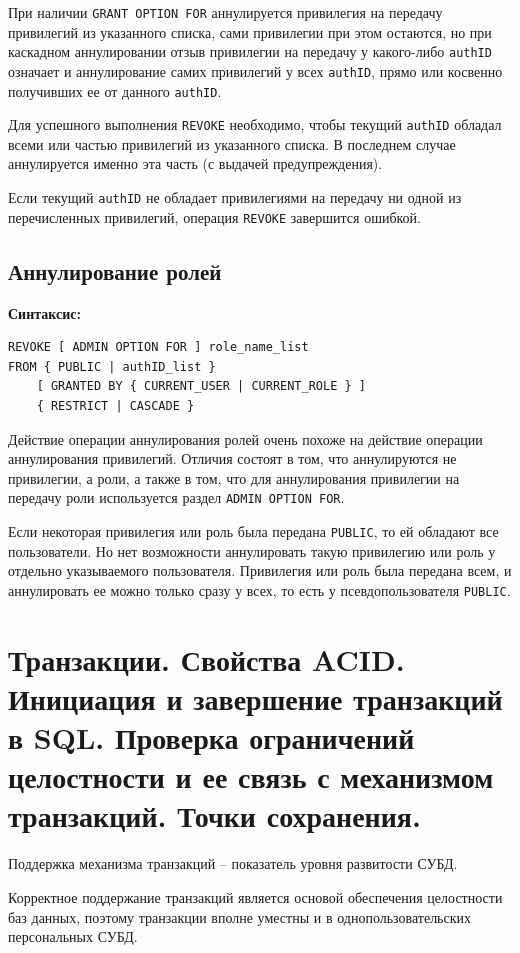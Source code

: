 \documentclass[a4paper,12pt]{article}
\begin{document}
При наличии \texttt{GRANT OPTION FOR} аннулируется привилегия на передачу привилегий из указанного списка, сами привилегии при этом остаются, но при каскадном аннулировании отзыв привилегии на передачу у какого-либо \texttt{authID} означает и аннулирование самих привилегий у всех \texttt{authID}, прямо или косвенно получивших ее от данного \texttt{authID}.

Для успешного выполнения \texttt{REVOKE} необходимо, чтобы текущий \texttt{authID} обладал всеми или частью привилегий из указанного списка. В последнем случае аннулируется именно эта часть (с выдачей предупреждения).

Если текущий \texttt{authID} не обладает привилегиями на передачу ни одной из перечисленных привилегий, операция \texttt{REVOKE} завершится ошибкой.

\subsection{Аннулирование ролей}

\textbf{Синтаксис:}
\begin{verbatim}
REVOKE [ ADMIN OPTION FOR ] role_name_list 
FROM { PUBLIC | authID_list }
    [ GRANTED BY { CURRENT_USER | CURRENT_ROLE } ]
    { RESTRICT | CASCADE }
\end{verbatim}

Действие операции аннулирования ролей очень похоже на действие операции аннулирования привилегий. Отличия состоят в том, что аннулируются не привилегии, а роли, а также в том, что для аннулирования привилегии на передачу роли используется раздел \texttt{ADMIN OPTION FOR}.

Если некоторая привилегия или роль была передана \texttt{PUBLIC}, то ей обладают все пользователи. Но нет возможности аннулировать такую привилегию или роль у отдельно указываемого пользователя. Привилегия или роль была передана всем, и аннулировать ее можно только сразу у всех, то есть у псевдопользователя \texttt{PUBLIC}.

\section{Транзакции. Свойства ACID. Инициация и завершение транзакций в SQL. Проверка ограничений целостности и ее связь с механизмом транзакций. Точки сохранения.}

Поддержка механизма транзакций – показатель уровня развитости СУБД.

Корректное поддержание транзакций является основой обеспечения целостности баз данных, поэтому транзакции вполне уместны и в однопользовательских персональных СУБД.
\end{document}
